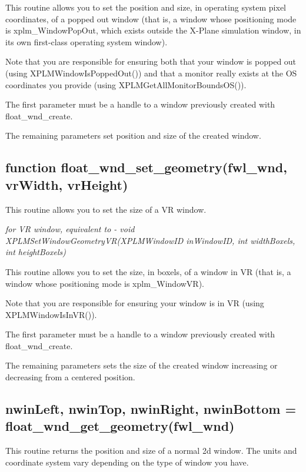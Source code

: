 \documentclass[11pt,parskip=half,a4paper]{scrartcl}
\begin{document}
This routine allows you to set the position and size, in operating system pixel coordinates, of a popped out window (that is, a window whose positioning mode is xplm\_WindowPopOut, which exists outside the X-Plane simulation window, in its own first-class operating system window).

Note that you are responsible for ensuring both that your window is popped out (using XPLMWindowIsPoppedOut()) and that a monitor really exists at the OS coordinates you provide (using XPLMGetAllMonitorBoundsOS()).

The first parameter must be a handle to a window previously created with float\_wnd\_create.

The remaining parameters set position and size of the created window.

\newpage

\subsection{\hspace*{1.0mm}function float\_wnd\_set\_geometry(fwl\_wnd, vrWidth, vrHeight)}

This routine allows you to set the size of a VR window.

\emph{for VR window, equivalent to       - void XPLMSetWindowGeometryVR(XPLMWindowID inWindowID, int widthBoxels, int heightBoxels)}

This routine allows you to set the size, in boxels, of a window in VR (that is, a window whose positioning mode is xplm\_WindowVR).

Note that you are responsible for ensuring your window is in VR (using XPLMWindowIsInVR()).

The first parameter must be a handle to a window previously created with float\_wnd\_create.

The remaining parameters sets the size of the created window increasing or decreasing from a centered position.
 
\newpage

\subsection{\hspace*{1.0mm}nwinLeft, nwinTop, nwinRight, nwinBottom = float\_wnd\_get\_geometry(fwl\_wnd)}

This routine returns the position and size of a normal 2d window. The units and coordinate system vary depending on the type of window you have.
\end{document}

